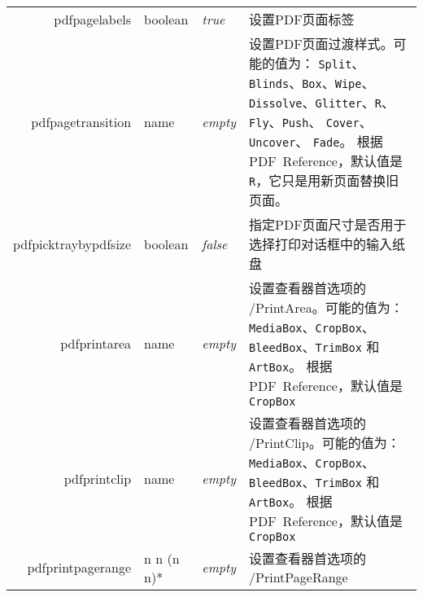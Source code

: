 \documentclass{article}
\begin{document}
\begin{longtable}{@{}>{\ttfamily}r>{\raggedright}p{}>{\itshape}lp{7cm}@{}}
  pdfpagelabels       & boolean        & true                      & 设置PDF页面标签                                                                                                                                                                                                                    \\
  pdfpagetransition   & name           & empty                     & 设置PDF页面过渡样式。可能的值为：
  \verb|Split|、\verb|Blinds|、\verb|Box|、\verb|Wipe|、
  \verb|Dissolve|、\verb|Glitter|、\verb|R|、
  \verb|Fly|、\verb|Push|、
  \verb|Cover|、\verb|Uncover|、
  \verb|Fade|。
  根据PDF~Reference，默认值是 \verb|R|，它只是用新页面替换旧页面。                                                                                                                                                                                                                                                     \\
  pdfpicktraybypdfsize
                      & boolean        & false                     & 指定PDF页面尺寸是否用于选择打印对话框中的输入纸盘                                                                                                                                                                                                   \\
  pdfprintarea        & name           & empty                     & 设置查看器首选项的 /PrintArea。可能的值为：
  \verb|MediaBox|、\verb|CropBox|、
  \verb|BleedBox|、\verb|TrimBox| 和 \verb|ArtBox|。
  根据PDF~Reference，默认值是 \verb|CropBox|                                                                                                                                                                                                                                                             \\
  pdfprintclip        & name           & empty                     & 设置查看器首选项的 /PrintClip。可能的值为：
  \verb|MediaBox|、\verb|CropBox|、
  \verb|BleedBox|、\verb|TrimBox| 和 \verb|ArtBox|。
  根据PDF~Reference，默认值是 \verb|CropBox|                                                                                                                                                                                                                                                             \\
  pdfprintpagerange   & n n (n n)*
                      & empty          & 设置查看器首选项的 /PrintPageRange                                                                                                                                                                                                                                \\

\end{longtable}
\end{document}

